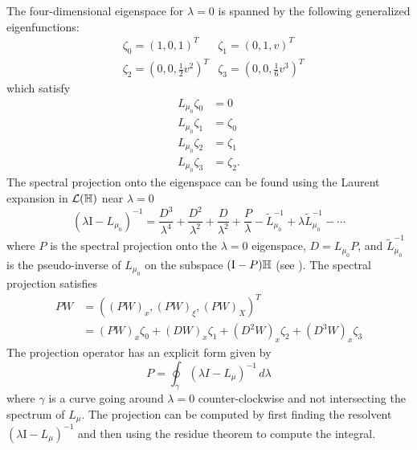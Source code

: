The four-dimensional eigenspace for \(\lambda = 0\) is spanned by the following generalized eigenfunctions:
\begin{equation}
	\begin{aligned}
		&\zeta_0 = (1,0,1)^T  &\zeta_1 = (0,1,v)^T \\
		&\zeta_2 = (0, 0, \frac 12 v^2)^T & \zeta_3 = (0,0,\frac 1 6 v^3)^T
	\end{aligned}
\end{equation}
which satisfy
\begin{equation}
	\begin{aligned}
		L_{\mu_0} \zeta_0 &= 0 \\
		L_{\mu_0} \zeta_1 &= \zeta_0 \\
		L_{\mu_0} \zeta_2 &= \zeta_1 \\
		L_{\mu_0} \zeta_3 &= \zeta_2.
	\end{aligned}
\end{equation}
The spectral projection onto the eigenspace can be found using the Laurent expansion in \(\mathcal{L}(\mathbb{H})\) near \(\lambda = 0\)
\begin{equation}
	(\lambda \mathrm I - L_{\mu_0} )^{-1} = \frac{D^3}{\lambda^4} + \frac{D^2}{\lambda^2} + \frac{D}{\lambda^2} + \frac P \lambda - \tilde L _{\mu_0} ^{-1} + \lambda \tilde L_{\mu_0} ^{-1} - \cdots
\end{equation}
where \(P\) is the spectral projection onto the \(\lambda = 0\) eigenspace, \(D = L_{\mu_0} P\), and \(\tilde L _{\mu_0} ^{-1}\) is the pseudo-inverse of \(L_{\mu_0}\) on the subspace \((\mathrm I - P)\mathbb{H}\) (see \cite{kato2013perturbation}). The spectral projection satisfies
\begin{equation}
\begin{aligned}
	PW &= ((PW)_x, (PW)_\xi, (PW)_X)^T \\
	&= (PW)_x \zeta_0 + (DW)_x\zeta_1 + (D^2W)_x\zeta_2 + (D^3W)_x \zeta_3
\end{aligned}
\end{equation}
The projection operator has an explicit form given by 
\begin{equation}
	P = \oint_\gamma (\lambda I - L_\mu)^{-1} \, d\lambda
\end{equation}
where \(\gamma\) is a curve going around \(\lambda = 0\) counter-clockwise and not intersecting the spectrum of \(L_\mu\). The projection can be computed by first finding the resolvent \((\lambda \mathrm I - L_\mu)^{-1}\) and then using the residue theorem to compute the integral. 

